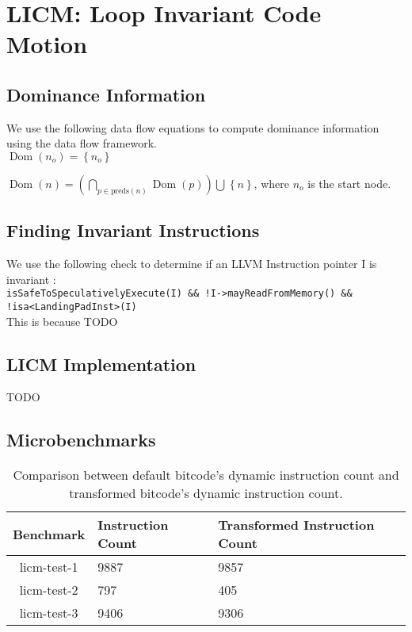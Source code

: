 \section{LICM: Loop Invariant Code Motion}

\subsection{Dominance Information}

We use the following data flow equations to compute dominance information using the
data flow framework. \\

$\operatorname{Dom}(n_o) = \left \{ n_o \right \}$

$\operatorname{Dom}(n) = \left ( \bigcap_{p \in \text{preds}(n)}^{} \operatorname{Dom}(p) \right ) \bigcup^{} \left \{ n \right \}$,
where $n_o$ is the start node.

\subsection{Finding Invariant Instructions}

We use the following check to determine if an LLVM Instruction pointer I is invariant :\\

\texttt{isSafeToSpeculativelyExecute(I) \&\& !I->mayReadFromMemory() \&\& !isa<LandingPadInst>(I)}\\

This is because TODO

\subsection{LICM Implementation}

TODO

\subsection{Microbenchmarks}

\begin{table}[!ht]
\centering
\begin{tabular}{c|l|l}
  \toprule
  \textbf{Benchmark} & \textbf{Instruction Count} & \textbf{Transformed Instruction Count} \\
  \midrule
  licm-test-1 & 9887 & 9857 \\ 
  licm-test-2 & 797  & 405 \\
  licm-test-3 & 9406 & 9306 \\ 
  \bottomrule
\end{tabular}
\caption{Comparison between default bitcode's dynamic instruction count and transformed
  bitcode's dynamic instruction count.}
\end{table}  


